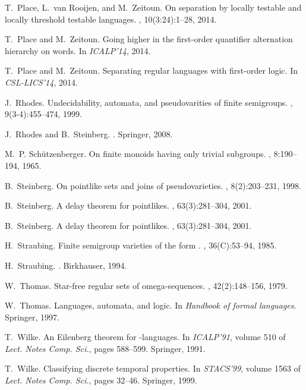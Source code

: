 \documentclass{CSML}
\theoremstyle{plain}
\begin{document}
\begin{thebibliography}{10}
T.~Place, L.~van Rooijen, and M.~Zeitoun.
\newblock On separation by locally testable and locally threshold testable
  languages.
, 10(3:24):1--28, 2014.

T.~Place and M.~Zeitoun.
\newblock Going higher in the first-order quantifier alternation hierarchy on
  words.
\newblock In {\em {ICALP'14}}, 2014.

T.~Place and M.~Zeitoun.
\newblock Separating regular languages with first-order logic.
\newblock In {\em {CSL-LICS'14}}, 2014.

J.~Rhodes.
\newblock Undecidability, automata, and pseudovarities of finite semigroups.
, 9(3-4):455--474, 1999.

J.~Rhodes and B.~Steinberg.
.
\newblock Springer, 2008.

M.~P. Sch{\"u}tzenberger.
\newblock On finite monoids having only trivial subgroups.
, 8:190--194, 1965.

B.~Steinberg.
\newblock On pointlike sets and joins of pseudovarieties.
, 8(2):203--231, 1998.

B.~Steinberg.
\newblock A delay theorem for pointlikes.
, 63(3):281--304, 2001.

B.~Steinberg.
\newblock A delay theorem for pointlikes.
, 63(3):281--304, 2001.

H.~Straubing.
\newblock Finite semigroup varieties of the form {}.
, 36({C}):53--94, 1985.

H.~Straubing.
.
\newblock Birkhauser, 1994.

W.~Thomas.
\newblock Star-free regular sets of omega-sequences.
, 42(2):148--156, 1979.

W.~Thomas.
\newblock Languages, automata, and logic.
\newblock In {\em Handbook of formal languages}. Springer, 1997.

T.~Wilke.
\newblock An {E}ilenberg theorem for {}-languages.
\newblock In {\em ICALP'91}, volume 510 of {\em Lect. Notes Comp. Sci.}, pages
  588--599. Springer, 1991.

T.~Wilke.
\newblock Classifying discrete temporal properties.
\newblock In {\em STACS'99}, volume 1563 of {\em Lect. Notes Comp. Sci.},
  pages 32--46. Springer, 1999.

\end{thebibliography}
\end{document}
